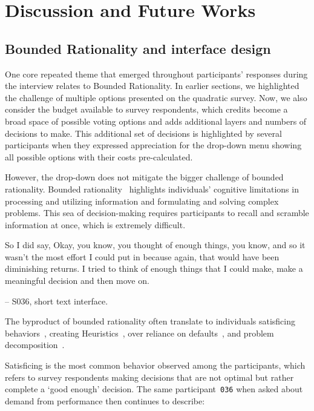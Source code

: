 \section{Discussion and Future Works}
\label{sec:discussion}

\subsection{Bounded Rationality and interface design}
One core repeated theme that emerged throughout participants' responses during the interview relates to Bounded Rationality. In earlier sections, we highlighted the challenge of multiple options presented on the quadratic survey. Now, we also consider the budget available to survey respondents, which credits become a broad space of possible voting options and adds additional layers and numbers of decisions to make. This additional set of decisions is highlighted by several participants when they expressed appreciation for the drop-down menu showing all possible options with their costs pre-calculated.

However, the drop-down does not mitigate the bigger challenge of bounded rationality. Bounded rationality~\cite{simonBehavioralModelRational1955} highlights individuals' cognitive limitations in processing and utilizing information and formulating and solving complex problems. This sea of decision-making requires participants to recall and scramble information at once, which is extremely difficult.

\begin{displayquote}
So I did say, Okay, you know, you thought of enough things, you know, and so it wasn't the most effort I could put in because again, that would have been diminishing returns. I tried to think of enough things that I could make, make a meaningful decision and then move on.

\noindent \hfill -- S036, short text interface.
\end{displayquote}

The byproduct of bounded rationality often translate to individuals satisficing behaviors~\cite{gigerenzerReasoningFastFrugal1996}, creating Heuristics~\cite{tverskyJudgmentUncertaintyHeuristics1974}, over reliance on defaults~\cite{thalerNudgeImprovingDecisions2008a}, and problem decomposition~\cite{simonSciencesArtificial1996}. 

Satisficing is the most common behavior observed among the participants, which refers to survey respondents making decisions that are not optimal but rather complete a `good enough' decision. The same participant~\texttt{036} when asked about demand from performance then continues to describe:

